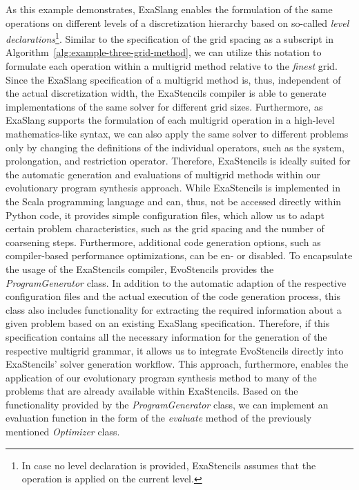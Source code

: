 As this example demonstrates, ExaSlang enables the formulation of the same operations on different levels of a discretization hierarchy based on so-called \emph{level declarations}\footnote{In case no level declaration is provided, ExaStencils assumes that the operation is applied on the current level.}.
Similar to the specification of the grid spacing as a subscript in Algorithm~\ref{alg:example-three-grid-method}, we can utilize this notation to formulate each operation within a multigrid method relative to the \emph{finest} grid.
Since the ExaSlang specification of a multigrid method is, thus, independent of the actual discretization width, the ExaStencils compiler is able to generate implementations of the same solver for different grid sizes.
Furthermore, as ExaSlang supports the formulation of each multigrid operation in a high-level mathematics-like syntax, we can also apply the same solver to different problems only by changing the definitions of the individual operators, such as the system, prolongation, and restriction operator.
Therefore, ExaStencils is ideally suited for the automatic generation and evaluations of multigrid methods within our evolutionary program synthesis approach.
While ExaStencils is implemented in the Scala programming language and can, thus, not be accessed directly within Python code, it provides simple configuration files, which allow us to adapt certain problem characteristics, such as the grid spacing and the number of coarsening steps.
Furthermore, additional code generation options, such as compiler-based performance optimizations, can be en- or disabled.
To encapsulate the usage of the ExaStencils compiler, EvoStencils provides the \emph{ProgramGenerator} class.
In addition to the automatic adaption of the respective configuration files and the actual execution of the code generation process, this class also includes functionality for extracting the required information about a given problem based on an existing ExaSlang specification. 
Therefore, if this specification contains all the necessary information for the generation of the respective multigrid grammar, it allows us to integrate EvoStencils directly into ExaStencils' solver generation workflow.
This approach, furthermore, enables the application of our evolutionary program synthesis method to many of the problems that are already available within ExaStencils.
Based on the functionality provided by the \emph{ProgramGenerator} class, we can implement an evaluation function in the form of the \emph{evaluate} method of the previously mentioned \emph{Optimizer} class.
